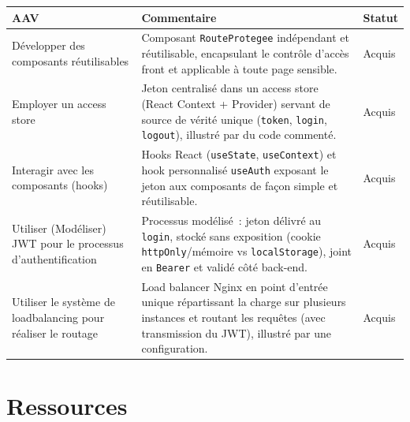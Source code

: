 \begin{center}
\setlength{\tabcolsep}{10pt}

\begin{tabular}{|p{}|p{}|m{}|}
\hline
\textbf{AAV} & \textbf{Commentaire} & \textbf{Statut} \\ \hline

Développer des composants réutilisables &
Composant \texttt{RouteProtegee} indépendant et réutilisable, encapsulant le contrôle d'accès front et applicable à toute page sensible. &
{\color{green!60!black}Acquis} \\ \hline

Employer un access store &
Jeton centralisé dans un access store (React Context + Provider) servant de source de vérité unique (\texttt{token}, \texttt{login}, \texttt{logout}), illustré par du code commenté. &
{\color{green!60!black}Acquis} \\ \hline

Interagir avec les composants (hooks) &
Hooks React (\texttt{useState}, \texttt{useContext}) et hook personnalisé \texttt{useAuth} exposant le jeton aux composants de façon simple et réutilisable. &
{\color{green!60!black}Acquis} \\ \hline

Utiliser (Modéliser) JWT pour le processus d'authentification &
Processus modélisé~: jeton délivré au \texttt{login}, stocké sans exposition (cookie \texttt{httpOnly}/mémoire vs \texttt{localStorage}), joint en \texttt{Bearer} et validé côté back-end. &
{\color{green!60!black}Acquis} \\ \hline

Utiliser le système de loadbalancing pour réaliser le routage &
Load balancer Nginx en point d'entrée unique répartissant la charge sur plusieurs instances et routant les requêtes (avec transmission du JWT), illustré par une configuration. &
{\color{green!60!black}Acquis} \\ \hline

\end{tabular}
\end{center}

\newpage

\section*{Ressources}

